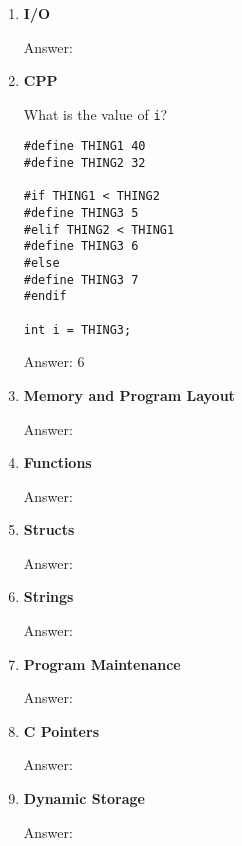 \documentclass[11pt]{article}
\newenvironment{answer}{\large\lstset{basicstyle=\tiny\ttfamily}\color{white} \small{Answer:}}{}
\newenvironment{answer}{\large\lstset{basicstyle=\large\ttfamily}\color{red} \small{Answer:}}{}
\begin{document}
\begin{enumerate}
\begin{answer}
\end{answer}



\item \textbf{I/O}

\begin{answer}
\end{answer}



\item \textbf{CPP}

What is the value of \texttt{i}?
\begin{verbatim}
#define THING1 40
#define THING2 32

#if THING1 < THING2
#define THING3 5
#elif THING2 < THING1
#define THING3 6
#else
#define THING3 7
#endif

int i = THING3;
\end{verbatim}
\begin{answer}
6
\end{answer}



\item \textbf{Memory and Program Layout}

\begin{answer}
\end{answer}



\item \textbf{Functions}

\begin{answer}
\end{answer}



\item \textbf{Structs}

\begin{answer}
\end{answer}



\item \textbf{Strings}

\begin{answer}
\end{answer}



\item \textbf{Program Maintenance}

\begin{answer}
\end{answer}



\item \textbf{C Pointers}

\begin{answer}
\end{answer}



\item \textbf{Dynamic Storage}

\begin{answer}
\end{answer}




\end{enumerate}
\end{document}
